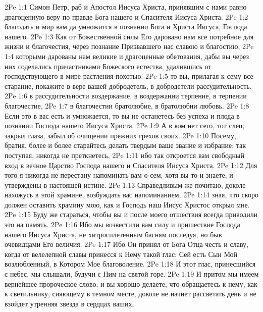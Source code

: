 \vs 2Pe 1:1 Симон Петр, раб и Апостол Иисуса Христа, принявшим с нами равно драгоценную веру по правде Бога нашего и Спасителя Иисуса Христа:
\vs 2Pe 1:2 благодать и мир вам да умножится в познании Бога и Христа Иисуса, Господа нашего.
\rsbpar\vs 2Pe 1:3 Как от Божественной силы Его даровано нам все потребное для жизни и благочестия, через познание Призвавшего нас славою и благостию,
\vs 2Pe 1:4 которыми дарованы нам великие и драгоценные обетования, дабы вы через них соделались причастниками Божеского естества, удалившись от господствующего в мире растления похотью:
\vs 2Pe 1:5 то вы, прилагая к сему все старание, покажите в вере вашей добродетель, в добродетели рассудительность,
\vs 2Pe 1:6 в рассудительности воздержание, в воздержании терпение, в терпении благочестие,
\vs 2Pe 1:7 в благочестии братолюбие, в братолюбии любовь.
\vs 2Pe 1:8 Если это в вас есть и умножается, то вы не останетесь без успеха и плода в познании Господа нашего Иисуса Христа.
\vs 2Pe 1:9 А в ком нет сего, тот слеп, закрыл глаза, забыл об очищении прежних грехов своих.
\vs 2Pe 1:10 Посему, братия, более и более старайтесь делать твердым ваше звание и избрание; так поступая, никогда не преткнетесь,
\vs 2Pe 1:11 ибо так откроется вам свободный вход в вечное Царство Господа нашего и Спасителя Иисуса Христа.
\rsbpar\vs 2Pe 1:12 Для того я никогда не перестану напоминать вам о сем, хотя вы то и знаете, и утверждены в настоящей истине.
\vs 2Pe 1:13 Справедливым же почитаю, доколе нахожусь в этой  храмине, возбуждать вас напоминанием,
\vs 2Pe 1:14 зная, что скоро должен оставить храмину мою, как и Господь наш Иисус Христос открыл мне.
\vs 2Pe 1:15 Буду же стараться, чтобы вы и после моего отшествия всегда приводили это на память.
\vs 2Pe 1:16 Ибо мы возвестили вам силу и пришествие Господа нашего Иисуса Христа, не хитросплетенным басням последуя, но быв очевидцами Его величия.
\vs 2Pe 1:17 Ибо Он принял от Бога Отца честь и славу, когда от велелепной славы принесся к Нему такой глас: Сей есть Сын Мой возлюбленный, в Котором Мое благоволение.
\vs 2Pe 1:18 И этот глас, принесшийся с небес, мы слышали, будучи с Ним на святой горе.
\vs 2Pe 1:19 И притом мы имеем вернейшее пророческое слово; и вы хорошо делаете, что обращаетесь к нему, как к светильнику, сияющему в темном месте, доколе не начнет рассветать день и не взойдет утренняя звезда в сердцах ваших,
